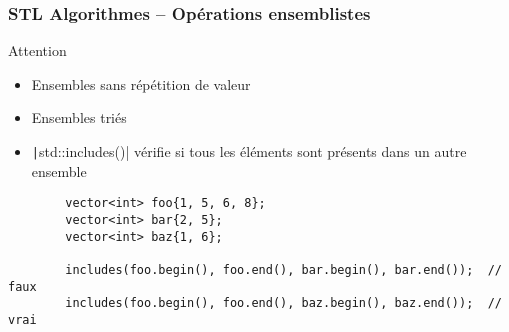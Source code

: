 \documentclass[C++.tex]{subfiles}
\begin{document}
\begin{frame}[fragile]
	\frametitle{STL Algorithmes -- Opérations ensemblistes}
	\begin{alertblock}{Attention}
		\begin{itemize}
			\item Ensembles sans répétition de valeur
			\item Ensembles triés
		\end{itemize}
	\end{alertblock}

	\begin{itemize}
		\item \texttt|std::includes()| vérifie si tous les éléments sont présents dans un autre ensemble
	\end{itemize}

	\begin{verbatim}
		vector<int> foo{1, 5, 6, 8};
		vector<int> bar{2, 5};
		vector<int> baz{1, 6};

		includes(foo.begin(), foo.end(), bar.begin(), bar.end());  // faux
		includes(foo.begin(), foo.end(), baz.begin(), baz.end());  // vrai
	\end{verbatim}
\end{frame}
\end{document}
